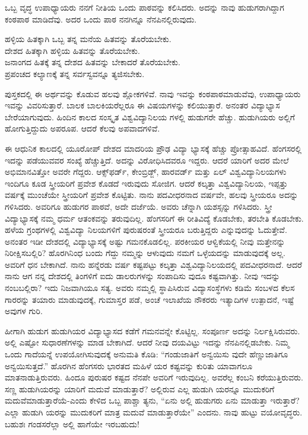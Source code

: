 ಒಬ್ಬ ವೃದ್ಧ ಉಪಾಧ್ಯಾಯರು ನನಗೆ ನೀತಿಯ ಒಂದು ಪಾಠವನ್ನು ಕಲಿಸಿದರು. ಅದನ್ನು ನಾವು ಹುಡುಗರಾಗಿದ್ದಾಗ ಕಂಠಪಾಠ ಮಾಡಿದೆವು. ಅದರ ಒಂದು ಪಾಠ ನನಗಿನ್ನೂ ನೆನಪಿನಲ್ಲಿರುವುದು.

\begin{myquote}
ಹಳ್ಳಿಯ ಹಿತಕ್ಕಾಗಿ ಒಬ್ಬ ತನ್ನ ಮನೆಯ ಹಿತವನ್ನು ತೊರೆಯಬೇಕು.\\ದೇಶದ ಹಿತಕ್ಕಾಗಿ ಹಳ್ಳಿಯ ಹಿತವನ್ನು ತೊರೆಯಬೇಕು.\\ಜನಾಂಗದ ಹಿತಕ್ಕೆ ತನ್ನ ದೇಶದ ಹಿತವನ್ನು ಬೇಕಾದರೆ ತೊರೆಯಬೇಕು.\\ಪ್ರಪಂಚದ ಕಲ್ಯಾಣಕ್ಕೆ ತನ್ನ ಸರ್ವಸ್ವವನ್ನೂ ತ್ಯಜಿಸಬೇಕು.
\end{myquote}

ಪುಸ್ತಕದಲ್ಲಿ ಈ ಅರ್ಥವನ್ನು ಕೊಡುವ ಹಲವು ಶ್ಲೋಕಗಳಿವೆ. ನಾವು ಇವನ್ನು ಕಂಠಪಾಠಮಾಡುವೆವು, ಉಪಾಧ್ಯಾಯರು ಇವನ್ನು ವಿವರಿಸುತ್ತಾರೆ. ಬಾಲಕ ಬಾಲಕಿಯರೆಲ್ಲರೂ ಈ ವಿಷಯಗಳನ್ನು ಕಲಿಯುತ್ತಾರೆ. ಅನಂತರ ವಿದ್ಯಾಭ್ಯಾಸ ಬೇರೆಯಾಗುವುದು. ಹಿಂದಿನ ಕಾಲದ ಸಂಸ್ಕೃತ ವಿಶ್ವವಿದ್ಯಾನಿಲಯ ಗಳಲ್ಲಿ ಹುಡುಗರೇ ಹೆಚ್ಚು. ಹುಡುಗಿಯರು ಅಲ್ಲಿಗೆ ಹೋಗುತ್ತಿದ್ದುದು ಅಪರೂಪ. ಆದರೆ ಕೆಲವು ಅಪವಾದಗಳಿವೆ.

ಈ ಆಧುನಿಕ ಕಾಲದಲ್ಲಿ ಯೂರೋಪ್​ ದೇಶದ ಮಾದರಿಯ ಪ್ರೌಢ ವಿದ್ಯಾ ಭ್ಯಾಸಕ್ಕೆ ಹೆಚ್ಚು ಪ್ರೋತ್ಸಾಹವಿದೆ. ಹೆಂಗಸರಲ್ಲಿ ಇದನ್ನು ಪಡೆಯುವವರ ಸಂಖ್ಯೆ ಹೆಚ್ಚುತ್ತಿದೆ. ಅದನ್ನು ವಿರೋಧಿಸಿದವರೂ ಇದ್ದರು. ಆದರೆ ಯಾರಿಗೆ ಅದರ ಮೇಲೆ ಅಭಿಮಾನವಿತ್ತೋ ಅವರೇ ಗೆದ್ದರು. ಆಕ್ಸ್​ಫರ್ಡ್​, ಕೇಂಬ್ರಿಡ್ಜ್​, ಹಾರವರ್ಡ್​ ಮತ್ತು ಏಲ್​ ವಿಶ್ವವಿದ್ಯಾನಿಲಯಗಳು ಇಂದಿಗೂ ಕೂಡ ಸ್ತ್ರೀಯರಿಗೆ ಪ್ರವೇಶ ಕೊಡದೆ ಇರುವುದು ಸೋಜಿಗ. ಆದರೆ ಕಲ್ಕತ್ತಾ ವಿಶ್ವವಿದ್ಯಾನಿಲಯ, ಇಪ್ಪತ್ತು ವರ್ಷಕ್ಕೆ ಮುಂಚೆಯೇ ಸ್ತ್ರೀಯರಿಗೆ ಪ್ರವೇಶ ಕೊಟ್ಟಿತು. ನಾನು ಪದವೀಧರನಾದ ವರ್ಷವೇ, ಹಲವು ಸ್ತ್ರೀಯರೂ ಅದನ್ನು ಗಳಿಸಿದರು. ಅವರಿಗೂ ಹುಡುಗರ ಪಾಠವೆ, ಅದೇ ದರ್ಜೆಯೆ. ಅವರು ಚೆನ್ನಾಗಿ ಯಶಸ್ಸನ್ನು ಗಳಿಸಿದರು. ಸ್ತ್ರೀ ವಿದ್ಯಾಭ್ಯಾಸಕ್ಕೆ ನಮ್ಮ ಧರ್ಮ ಆತಂಕವನ್ನು ತರುವುದಿಲ್ಲ. ಹೆಂಗಸರಿಗೆ ಈ ರೀತಿವಿದ್ಯೆ ಕೊಡಬೇಕು, ತರಬೇತಿ ಕೊಡಬೇಕು. ಹಳೆಯ ಗ್ರಂಥಗಳಲ್ಲಿ ವಿಶ್ವವಿದ್ಯಾ ನಿಲಯಗಳಿಗೆ ಪುರುಷರಂತೆ ಸ್ತ್ರೀಯರೂ ಬರುತ್ತಿದ್ದರು ಎನ್ನುವುದನ್ನು ಓದುತ್ತೇವೆ. ಅನಂತರ ಇಡೀ ದೇಶದಲ್ಲಿ ವಿದ್ಯಾಭ್ಯಾಸಕ್ಕೆ ಅಷ್ಟು ಗಮನಕೊಡಲಿಲ್ಲ. ಪರಕೀಯರ ಆಳ್ವಿಕೆಯಲ್ಲಿ ನೀವು ಮತ್ತೇನನ್ನು ನಿರೀಕ್ಷಿಸಬಲ್ಲಿರಿ? ಹೊರಗಿನಿಂಧ ಬಂದು ಗೆದ್ದು ನಮ್ಮನ್ನು ಆಳುವುದು ನಮಗೆ ಒಳ್ಳೆಯದನ್ನು ಮಾಡುವುದಕ್ಕೆ ಅಲ್ಲ. ಅವರಿಗೆ ಧನ ಬೇಕಾಗಿದೆ. ನಾನು ಹನ್ನೆರಡು ವರ್ಷ ಕಷ್ಟಪಟ್ಟು ಕಲ್ಕತ್ತಾ ವಿಶ್ವವಿದ್ಯಾನಿಲಯದಲ್ಲಿ ಪದವೀಧರನಾದೆ. ಆದರೆ ನಾನು ಆಗ ನನ್ನ ದೇಶದಲ್ಲಿ ತಿಂಗಳಿಗೆ ಐದು ಡಾಲರುಗಳನ್ನು ಸಂಪಾದಿಸು ವುದೂ ಕಷ್ಟವಾಗಿತ್ತು. ನೀವು ಇದನ್ನು ನಂಬಬಲ್ಲಿರಾ? ಇದು ನಿಜವಾಗಿಯೂ ಸತ್ಯ. ಅವರು ನಮ್ಮಲ್ಲಿ ಸ್ಥಾಪಿಸಿರುವ ವಿದ್ಯಾಸಂಸ್ಥೆಗಳು ಕಡಿಮೆ ಸಂಬಳದ ಕೆಲಸ ಗಾರರನ್ನು ತಯಾರು ಮಾಡುವುದಕ್ಕೆ, ಗುಮಾಸ್ತರ ಪಡೆ, ಅಂಚೆ ಇಲಾಖೆಯ ನೌಕರರು ಇತ್ಯಾದಿಗಳ ಉತ್ಪಾದನೆ, ಇಷ್ಟೆ ಅವುಗಳ ಗುರಿ.

ಹೀಗಾಗಿ ಹುಡುಗ ಹುಡುಗಿಯರ ವಿದ್ಯಾಭ್ಯಾಸದ ಕಡೆಗೆ ಗಮನವನ್ನೇ ಕೊಟ್ಟಿಲ್ಲ. ಸಂಪೂರ್ಣ ಅದನ್ನು ನಿರ್ಲಕ್ಷಿಸಿರುವರು. ಅಲ್ಲಿ ಎಷ್ಟೋ ಸುಧಾರಣೆಗಳನ್ನು ಮಾಡ ಬೇಕಾಗಿದೆ. ಆದರೆ ನೀವು ದಯವಿಟ್ಟು ಇದನ್ನು ನೆನಪಿನಲ್ಲಿಡಬೇಕು. ನಿಮ್ಮ ಒಂದು ಗಾದೆಯನ್ನೆ ಉಪಯೋಗಿಸುವುದಕ್ಕೆ ಅನುಮತಿ ಕೊಡಿ: “ಗಂಡುಜಾತಿಗೆ ಅನ್ವಯಿಸು ವುದೇ ಹೆಣ್ಣುಜಾತಿಗೂ ಅನ್ವಯಿಸುತ್ತದೆ.” ಹೊರಗಿನ ಹೆಂಗಸರು ಭಾರತದ ಮಹಿಳೆ ಯರ ಕಷ್ಟವನ್ನು ಕುರಿತು ಯಾವಾಗಲೂ ಮಾತನಾಡುತ್ತಿರುವರು. ಹಿಂದೂ ಪುರುಷರ ಕಷ್ಟದ ನೆನಪೇ ಅವರಿಗೆ ಇರುವುದಿಲ್ಲ. ಅವರೆಲ್ಲ ಕಂಬನಿ ಕರೆಯುತ್ತಿರುವರು. ಸಣ್ಣ ಹುಡುಗಿಯರನ್ನು ಯಾರಿಗೆ ಮದುವೆ ಮಾಡುತ್ತಾರೆ? ಅಲ್ಲಿರುವ ಎಲ್ಲ ಹುಡುಗಿ ಯರನ್ನೂ ಮುದುಕರಿಗೆ ಮದುವೆಮಾಡುತ್ತಾರೆಯೆ-ಎಂದು ಕೇಳಿದ ಒಬ್ಬ ಪಾಶ್ಚಾ ತ್ಯನು, “ಏನು ಅಲ್ಲಿ ಹುಡುಗರು ಏನು ಮಾಡುತ್ತಾ ಇರುತ್ತಾರೆ? ಎಲ್ಲಾ ಹುಡುಗಿ ಯರನ್ನು ಮುದುಕರಿಗೆ ಮಾತ್ರ ಮದುವೆ ಮಾಡುತ್ತಾರೆಯೇ” ಎಂದನು. ನಾವು ಹುಟ್ಟು ವಯೋವೃದ್ಧರು. ಬಹುಶಃ ಗಂಡಸರೆಲ್ಲಾ ಅಲ್ಲಿ ಹಾಗೆಯೇ ಇರಬಹುದು!

